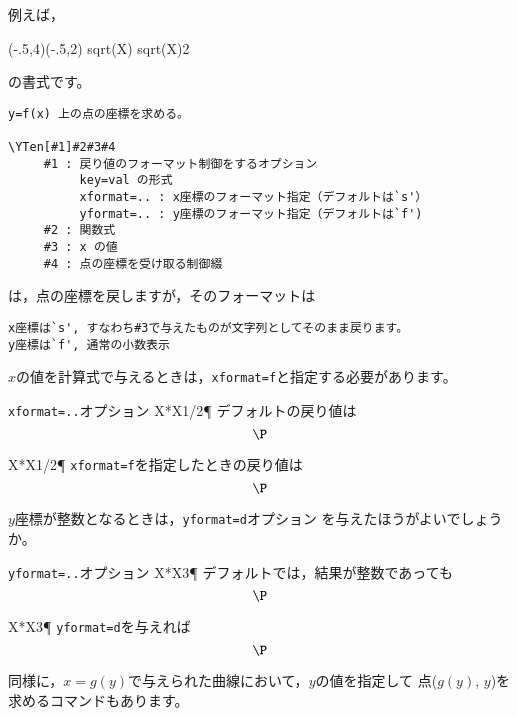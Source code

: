 例えば，

\begin{showEx}{}
\begin{zahyou}[ul=10mm]%
(-.5,4)(-.5,2)
  \def\Fx{sqrt(X)}
  \def\aval{2}
  \YGurafu*[hidarix=0]\Fx
  \Put{}
  \YTen\Fx\aval\A
  \Put\A[syaei=xy,xlabel=a,%
    ylabel=\sqrt{a}]{}
\end{zahyou}
\end{showEx}

の書式です。

\begin{boxnote}
\begin{verbatim}
y=f(x) 上の点の座標を求める。

\YTen[#1]#2#3#4
     #1 : 戻り値のフォーマット制御をするオプション
          key=val の形式
          xformat=.. : x座標のフォーマット指定（デフォルトは`s'）
          yformat=.. : y座標のフォーマット指定（デフォルトは`f')
     #2 : 関数式
     #3 : x の値
     #4 : 点の座標を受け取る制御綴
\end{verbatim}
\end{boxnote}

は，点の座標を戻しますが，そのフォーマットは
\begin{jquote}
\begin{verbatim}
x座標は`s', すなわち#3で与えたものが文字列としてそのまま戻ります。
y座標は`f', 通常の小数表示
\end{verbatim}
\end{jquote}

$x$の値を計算式で与えるときは，\verb+xformat=f+と指定する必要があります。

\begin{showEx}{\texttt{xformat=..}オプション}
\def\Fx{X*X}
\YTen\Fx{1/2}\P
デフォルトの戻り値は
\[ \P \]

\YTen[xformat=f]\Fx{1/2}\P
\verb+xformat=f+を指定したときの戻り値は
\[ \P \]
\end{showEx}

$y$座標が整数となるときは，\verb+yformat=d+オプション
を与えたほうがよいでしょうか。

\begin{showEx}{\texttt{yformat=..}オプション}
\def\Fx{X*X}
\YTen\Fx{3}\P
デフォルトでは，結果が整数であっても
\[ \P \]

\YTen[yformat=d]\Fx{3}\P
\verb+yformat=d+を与えれば
\[ \P \]
\end{showEx}


同様に，$x=g(y)$で与えられた曲線において，$y$の値を指定して
点($g(y)$, $y$)を求めるコマンドもあります。

